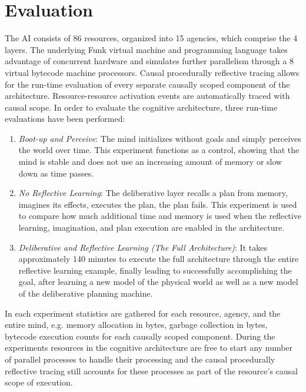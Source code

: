\chapter{Evaluation}
\label{chapter:evaulation}

The AI consists of 86 resources, organized into 15 agencies, which
comprise the 4 layers.  The underlying Funk virtual machine and
programming language takes advantage of concurrent hardware and
simulates further parallelism through a 8 virtual bytecode machine
processors.  Causal procedurally reflective tracing allows for the
run-time evaluation of every separate causally scoped component of the
architecture.  Resource-resource activation events are automatically
traced with causal scope.  In order to evaluate the cognitive
architecture, three run-time evaluations have been performed:
\begin{enumerate}
\item \emph{Boot-up and Perceive}: The mind initializes without goals
  and simply perceives the world over time.  This experiment functions
  as a control, showing that the mind is stable and does not use an
  increasing amount of memory or slow down as time passes.
\item \emph{No Reflective Learning}: The deliberative layer recalls a
  plan from memory, imagines its effects, executes the plan, the plan
  fails.  This experiment is used to compare how much additional time
  and memory is used when the reflective learning, imagination, and
  plan execution are enabled in the architecture.
\item \emph{Deliberative and Reflective Learning (The Full
  Architecture)}: It takes approximately 140 minutes to execute the
  full architecture through the entire reflective learning example,
  finally leading to successfully accomplishing the goal, after
  learning a new model of the physical world as well as a new model of
  the deliberative planning machine.
\end{enumerate}

In each experiment statistics are gathered for each resource, agency,
and the entire mind, e.g. memory allocation in bytes, garbage
collection in bytes, bytecode execution counts for each causally
scoped component.  During the experiments resources in the cognitive
architecture are free to start any number of parallel processes to
handle their processing and the causal procedurally reflective tracing
still accounts for these processes as part of the resource's causal
scope of execution.

